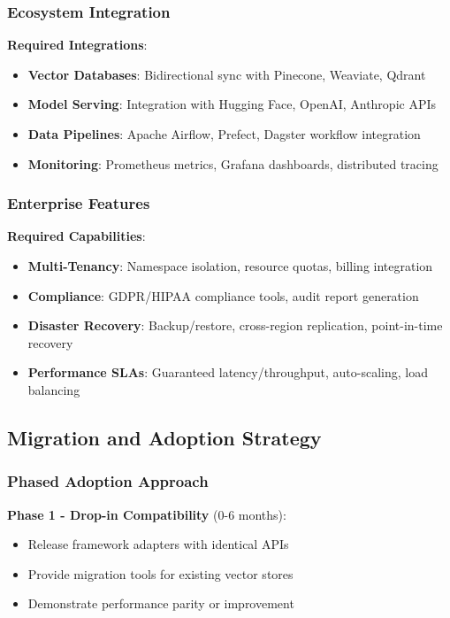 \documentclass[conference]{IEEEtran}
\begin{document}
\subsubsection{Ecosystem Integration}

\textbf{Required Integrations}:
\begin{itemize}[leftmargin=*]
\item \textbf{Vector Databases}: Bidirectional sync with Pinecone, Weaviate, Qdrant
\item \textbf{Model Serving}: Integration with Hugging Face, OpenAI, Anthropic APIs
\item \textbf{Data Pipelines}: Apache Airflow, Prefect, Dagster workflow integration
\item \textbf{Monitoring}: Prometheus metrics, Grafana dashboards, distributed tracing
\end{itemize}

\subsubsection{Enterprise Features}

\textbf{Required Capabilities}:
\begin{itemize}[leftmargin=*]
\item \textbf{Multi-Tenancy}: Namespace isolation, resource quotas, billing integration
\item \textbf{Compliance}: GDPR/HIPAA compliance tools, audit report generation
\item \textbf{Disaster Recovery}: Backup/restore, cross-region replication, point-in-time recovery
\item \textbf{Performance SLAs}: Guaranteed latency/throughput, auto-scaling, load balancing
\end{itemize}

\subsection{Migration and Adoption Strategy}

\subsubsection{Phased Adoption Approach}

\textbf{Phase 1 - Drop-in Compatibility} (0-6 months):
\begin{itemize}[leftmargin=*]
\item Release framework adapters with identical APIs
\item Provide migration tools for existing vector stores
\item Demonstrate performance parity or improvement
\end{itemize}
\end{document}
